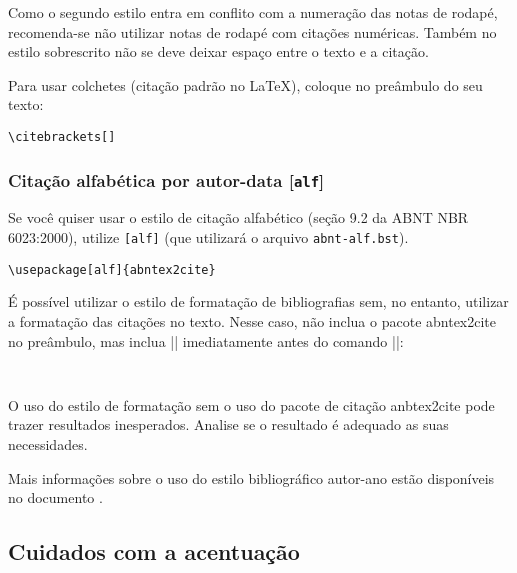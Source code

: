 \documentclass[a4paper]{ltxdoc}
\begin{document}
Como o segundo estilo entra em conflito com a numeração das notas de
rodapé, recomenda-se não utilizar notas de rodapé com citações numéricas. Também no estilo sobrescrito não se deve deixar espaço entre o texto e a citação. %

Para usar colchetes (citação padrão no \LaTeX), coloque no preâmbulo do seu texto:

\begin{verbatim}
\citebrackets[]
\end{verbatim}


\subsubsection{Citação alfabética por autor-data [\texttt{alf}]}

\DescribeMacro{\usepackage[alf]{abntex2cite}}
Se você quiser usar o estilo de citação alfabético
(seção 9.2 da ABNT NBR 6023:2000\cite{NBR6023:2000}),
utilize \texttt{[alf]} (que utilizará o arquivo \texttt{abnt-alf.bst}).

\begin{verbatim}
\usepackage[alf]{abntex2cite}
\end{verbatim}

É possível utilizar o estilo de formatação de bibliografias sem, no entanto,
utilizar a formatação das citações no texto. Nesse caso, não inclua o pacote
\textsf{abntex2cite} no preâmbulo, mas inclua ||
imediatamente antes do comando
||:

\begin{verbatim}


\end{verbatim}

O uso do estilo de formatação sem o uso do pacote de citação
\textsf{anbtex2cite} pode trazer resultados inesperados. Analise se o resultado
é adequado as suas necessidades.

Mais informações sobre o uso do estilo bibliográfico autor-ano estão disponíveis
no documento .

\subsection{Cuidados com a acentuação}
\end{document}
